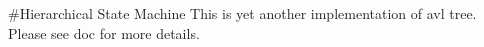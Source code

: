 \#\-Hierarchical State Machine This is yet another implementation of avl tree. Please see doc for more details. 